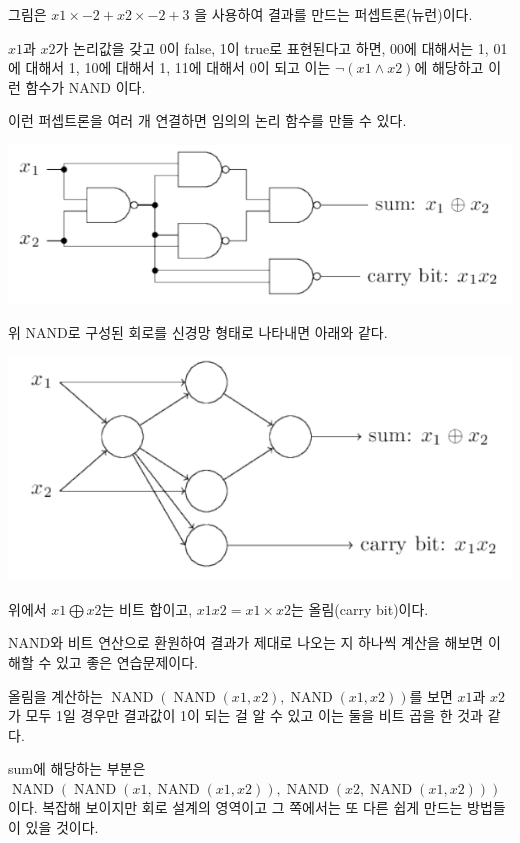 \documentclass[ %
    a4paper,    %
    amsmath,    %
    itemph,     %
]{oblivoir}     %
\DeclareMathOperator*{\NAND}{\text{NAND}}
\begin{document}
그림은 $x1 \times -2 + x2 \times -2 + 3$ 을 사용하여 결과를 만드는 퍼셉트론(뉴런)이다. 

$x1$과 $x2$가 논리값을 갖고 0이 false, 1이 true로 표현된다고 하면, 
00에 대해서는 1, 01에 대해서 1, 10에 대해서 1, 11에 대해서 0이 되고
이는 $\neg (x1 \land x2)$에 해당하고 이런 함수가 NAND 이다. 

이런 퍼셉트론을 여러 개 연결하면 임의의 논리 함수를 만들 수 있다. 

\begin{center}
\includegraphics[scale=0.7]{image/6_bits_add}
\end{center}

위 NAND로 구성된 회로를 신경망 형태로 나타내면 아래와 같다. 

\begin{center}
\includegraphics[scale=0.7]{image/6_bits_add_nn}
\end{center}

위에서 $x1 \bigoplus x2$는 비트 합이고, $x1 x2 = x1 \times x2$는 올림(carry bit)이다. 

NAND와 비트 연산으로 환원하여 결과가 제대로 나오는 지 하나씩 계산을 해보면
이해할 수 있고 좋은 연습문제이다. 

올림을 계산하는 $\NAND(\NAND(x1, x2), \NAND(x1, x2))$를 보면 $x1$과 $x2$가 모두 1일 경우만 
결과값이 1이 되는 걸 알 수 있고 이는 둘을 비트 곱을 한 것과 같다. 

sum에 해당하는 부분은 $\NAND(\NAND(x1, \NAND(x1, x2)), \NAND(x2, \NAND(x1, x2)))$이다. 
복잡해 보이지만 회로 설계의 영역이고 그 쪽에서는 또 다른 쉽게 만드는 방법들이 있을 것이다. 
\end{document}
